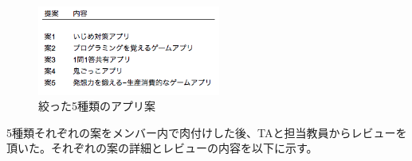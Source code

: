\documentclass[openany,11pt,papersize]{jsbook}
\begin{document}
\begin{figure}[H]
\begin{center}
\includegraphics[width=6cm, bb=0 0 329 162]{img/AppIdea.png}
\end{center}
\caption{絞った5種類のアプリ案}
\end{figure}

\par 5種類それぞれの案をメンバー内で肉付けした後、TAと担当教員からレビューを頂いた。それぞれの案の詳細とレビューの内容を以下に示す。
\end{document}
